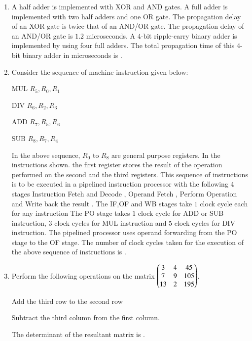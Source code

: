 \documentclass[journal,12pt,onecolumn]{IEEEtran}
\theoremstyle{remark}
\begin{document}
\begin{enumerate}
		\item A half adder is implemented with XOR and AND gates. A full adder is implemented with two half adders and one OR gate. The propagation delay of an XOR gate is twice that of an AND/OR gate. The propagation delay of an AND/OR gate is $1.2$ microseconds. A $4$-bit ripple-carry binary adder is implemented by using four full adders. The total propagation time of this $4$-bit binary adder in microseconds is \underline{\hspace{2cm}}.
		
		\hfill{}
		
		\item Consider the sequence of machine instruction given below:
		
		MUL $R_5, R_0, R_1$
		
		DIV $R_6, R_2, R_3$
		
		ADD $R_7, R_5, R_6$
		
		SUB $R_8, R_7, R_4$
		
		In the above sequence, $R_0$ to $R_8$ are general purpose registers. In the instructions shown. the first register stores the result of the operation performed on the second and the third registers. This sequence of instructions is to be executed in a pipelined instruction processor with the following $4$ stages  Instruction Fetch and Decode ,  Operand Fetch ,  Perform Operation  and  Write back the result  . The IF,OF and WB stages take $1$ clock cycle each for any instruction The PO stage takes $1$ clock cycle for ADD or SUB instruction, $3$ clock cycles for MUL instruction and $5$ clock cycles for DIV instruction. The pipelined processor uses operand forwarding from the PO stage to the OF stage. The number of clock cycles taken for the execution of the above sequence of instructions is \underline{\hspace{2cm}}.
		
		\hfill{}
		
		\item Perform the following operations on the matrix $\begin{pmatrix}3 & 4 & 45 \\ 7 & 9 & 105 \\ 13 & 2 & 195\end{pmatrix}$.
		
		 Add the third row to the second row
		
		 Subtract the third column from the first column.
		
		The determinant of the resultant matrix is \underline{\hspace{2cm}}.
		

\end{enumerate}
\end{document}
